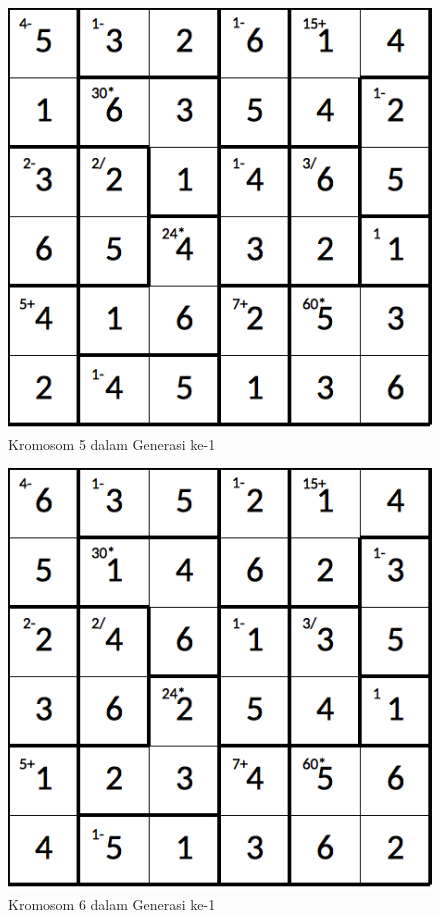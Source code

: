 \begin{figure}
\centering
\captionsetup{justification=centering}
\includegraphics[scale=0.333]{Gambar/hybridgenetic/Generation1Chromosome5}
\caption[Kromosom 5 dalam Generasi ke-1]{Kromosom 5 dalam Generasi ke-1}
\label{fig:analisisg1k5}
\end{figure}

\begin{figure}
\centering
\captionsetup{justification=centering}
\includegraphics[scale=0.333]{Gambar/hybridgenetic/Generation1Chromosome6}
\caption[Kromosom 6 dalam Generasi ke-1]{Kromosom 6 dalam Generasi ke-1}
\label{fig:analisisg1k6}
\end{figure}

